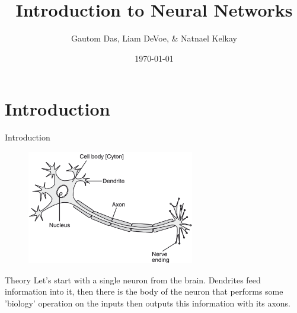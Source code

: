 \documentclass{beamer}
\title[Neural Networks]{Introduction to Neural Networks}
\author{Gautom Das, Liam DeVoe, \& Natnael Kelkay}
\institute{Montgomery Blair High School}
\date{\today}
\begin{document}
\begin{frame}
  \titlepage
\end{frame}


\section{Introduction}

\begin{frame}{Introduction}

\begin{figure}
\includegraphics[width=0.65\textwidth]{12img}
\end{figure}


\vskip -0.3cm

\begin{block}{Theory}
Let's start with a single neuron from the brain. Dendrites feed information into it, then there is the body of the neuron that performs some 'biology' operation on the inputs then outputs this information with its axons.
\end{block}

\end{frame}
\end{document}
